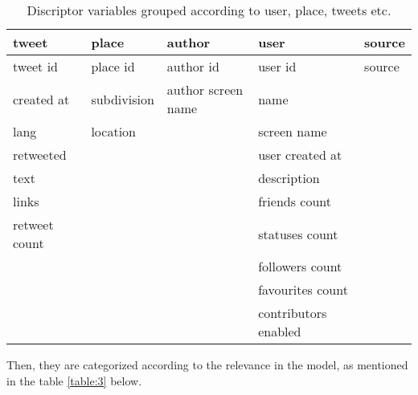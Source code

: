 \documentclass[a4paper,12pt, notitlepage]{article}
\begin{document}
\begin{table}[!htbp]
\centering
\begin{tabular}{ |l|l|l|l|l| }
\hline \rowcolor{Gray}
tweet & place & author & user & source \\[1ex]
\hline
tweet id      & place id    & author id          & user id             & source \\[1ex]
created at    & subdivision & author screen name & name                &        \\[1ex]
lang          & location    &                    & screen name         &        \\[1ex]
retweeted     &             &                    & user created at     &        \\[1ex]
text          &             &                    & description         &        \\[1ex]
links         &             &                    & friends count       &        \\[1ex]
retweet count &             &                    & statuses count      &        \\[1ex]
              &             &                    & followers count     &        \\[1ex]
              &             &                    & favourites count    &        \\[1ex]
              &             &                    & contributors enabled&        \\[1ex]
\hline
\end{tabular}
\caption{Discriptor variables grouped according to user, place, tweets etc.}
\label{table:2}
\end{table}

\par
Then, they are categorized according to the relevance in the model, as mentioned in the table \ref{table:3} below.
\end{document}
